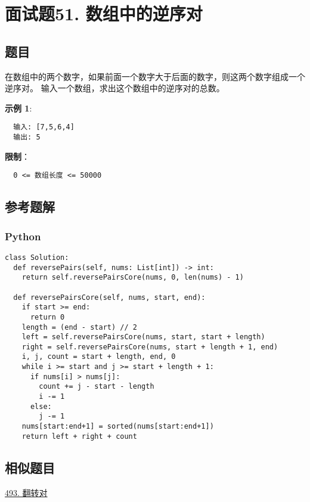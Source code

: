 \newpage
\section{面试题51. 数组中的逆序对}
\label{leetcode:sw_51}

\subsection{题目}

在数组中的两个数字，如果前面一个数字大于后面的数字，则这两个数字组成一个逆序对。
输入一个数组，求出这个数组中的逆序对的总数。

\textbf{示例 1}:

\begin{verbatim}
  输入: [7,5,6,4]
  输出: 5
\end{verbatim}

\textbf{限制}：

\begin{verbatim}
  0 <= 数组长度 <= 50000
\end{verbatim}

\subsection{参考题解}

\subsubsection{Python}

\begin{verbatim}
class Solution:
  def reversePairs(self, nums: List[int]) -> int:
    return self.reversePairsCore(nums, 0, len(nums) - 1)

  def reversePairsCore(self, nums, start, end):
    if start >= end:
      return 0
    length = (end - start) // 2
    left = self.reversePairsCore(nums, start, start + length)
    right = self.reversePairsCore(nums, start + length + 1, end)
    i, j, count = start + length, end, 0
    while i >= start and j >= start + length + 1:
      if nums[i] > nums[j]:
        count += j - start - length
        i -= 1
      else:
        j -= 1
    nums[start:end+1] = sorted(nums[start:end+1])
    return left + right + count
\end{verbatim}

\subsection{相似题目}

\hyperref[leetcode:493]{493. 翻转对}
